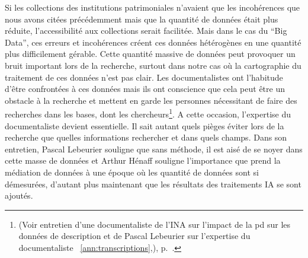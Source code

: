 Si les collections des institutions patrimoniales n'avaient que les incohérences que nous avons citées précédemment mais que la quantité de données était plus réduite, l'accessibilité aux collections serait facilitée. Mais dans le cas du \enquote{Big Data}, ces erreurs et incohérences créent ces données hétérogènes en une quantité plus difficilement gérable. Cette quantité massive de données peut provoquer un bruit important lors de la recherche, surtout dans notre cas où la cartographie du traitement de ces données n'est pas clair. Les documentalistes ont l'habitude d'être confrontées à ces données mais ils ont conscience que cela peut être un obstacle à la recherche et mettent en garde les personnes nécessitant de faire des recherches dans les bases, dont les chercheurs\footnote{(Voir entretien d'une documentaliste de l'INA sur l'impact de la \gls{pd} sur les données de description et de Pascal Lebeurier sur l'expertise du documentaliste ~\ref{ann:transcriptions},), p.~\pageref{ann:transcriptions}.}. A cette occasion, l'expertise du documentaliste devient essentielle. Il sait autant quels pièges éviter lors de la recherche que quelles informations rechercher et dans quels champs. Dans son entretien, Pascal Lebeurier souligne que sans méthode, il est aisé de se noyer dans cette masse de données et Arthur Hénaff souligne l'importance que prend la médiation de données à une époque où les quantité de données sont si démesurées, d'autant plus maintenant que les résultats des traitements IA se sont ajoutés.